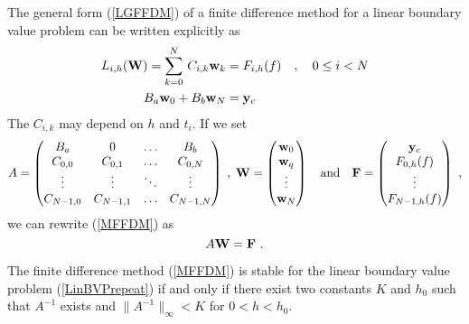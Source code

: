 The general form (\ref{LGFFDM}) of a finite difference method for a
linear boundary value problem can be written explicitly as
\begin{equation} \label{MFFDM}
\begin{split}
L_{i,h}(\mathbf{W}) = \sum_{k=0}^N\,C_{i,k} \mathbf{w}_k
& = F_{i,h}(f) \quad , \quad  0 \leq i < N \\
B_a\mathbf{w}_0 + B_b\mathbf{w}_N &= \mathbf{y}_c
\end{split}
\end{equation}
The $C_{i,k}$ may depend on $h$ and $t_i$.  If we set
\[
A = \begin{pmatrix}
B_a & 0 & \ldots & B_b \\
C_{0,0} & C_{0,1} & \ldots & C_{0,N} \\
\vdots & \vdots & \ddots & \vdots \\
C_{N-1,0} & C_{N-1,1} & \ldots & C_{N-1,N}
\end{pmatrix} \; , \;
\mathbf{W} = \begin{pmatrix}
\mathbf{w}_0 \\ \mathbf{w}_q \\ \vdots \\ \mathbf{w}_N
\end{pmatrix}
\quad \text{and} \quad
\mathbf{F} = \begin{pmatrix}
\mathbf{y}_c \\ F_{0,h}(f) \\ \vdots \\ F_{N-1,h}(f)
\end{pmatrix}  \ ,
\]
we can rewrite (\ref{MFFDM}) as
\begin{equation} \label{AWFfromFDM}
  A \mathbf{W} = \mathbf{F} \ .
\end{equation}

\begin{prop}
The finite difference method (\ref{MFFDM}) is stable for the linear
boundary value problem (\ref{LinBVPrepeat}) if and only if there exist
two constants $K$ and $h_0$ such that $A^{-1}$ exists and
$\| A^{-1} \|_\infty < K$ for $0< h < h_0$.
\label{BasicFDM}
\end{prop}

